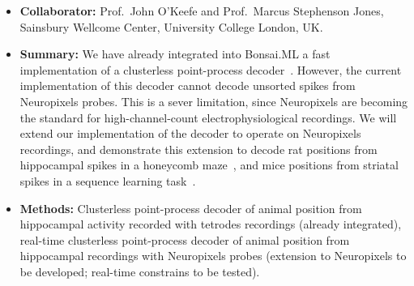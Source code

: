
\begin{itemize}

    \item\textbf{Collaborator:} Prof.~John O'Keefe and Prof.~Marcus Stephenson
        Jones, Sainsbury Wellcome Center, University College London, UK.

    \item\textbf{Summary:} We have already integrated into Bonsai.ML a fast
        implementation of a clusterless point-process decoder~\citep[i.e., a
        decoder that does not require spike sorting and is suitable for
        real-time usage,][]{denovellisEtAl21}. However, the current
        implementation of this decoder cannot decode unsorted spikes from
        Neuropixels probes.
        This is a sever limitation, since Neuropixels are becoming the standard
        for high-channel-count electrophysiological recordings.
        We will extend our implementation of the decoder to operate on
        Neuropixels recordings, and demonstrate this extension to decode rat
        positions from hippocampal spikes in a honeycomb
        maze~\citep{woodEtAl18}, and mice positions from striatal spikes in a
        sequence learning task~\citep{thompsonEtAl24}.

    \item\textbf{Methods:} Clusterless point-process decoder of animal position
        from hippocampal activity recorded with tetrodes recordings (already
        integrated), real-time clusterless point-process decoder of animal
        position from hippocampal recordings with Neuropixels probes
        (extension to Neuropixels to be developed; real-time constrains to be
        tested).

\end{itemize}



